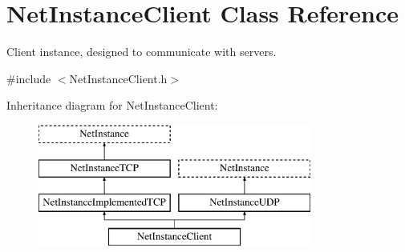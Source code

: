 \hypertarget{class_net_instance_client}{
\section{NetInstanceClient Class Reference}
\label{class_net_instance_client}
}


Client instance, designed to communicate with servers.  




{\ttfamily \#include $<$NetInstanceClient.h$>$}

Inheritance diagram for NetInstanceClient:\begin{figure}[H]
\begin{center}
\leavevmode
\includegraphics[height=4.000000cm]{class_net_instance_client}
\end{center}
\end{figure}
